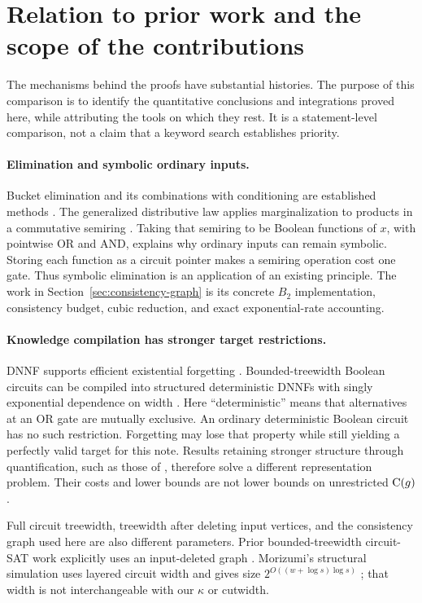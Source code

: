 \section{Relation to prior work and the scope of the contributions}
\label{sec:prior-work}

The mechanisms behind the proofs have substantial histories. The purpose
of this comparison is to identify the quantitative conclusions and
integrations proved here, while attributing the tools on which they rest.
It is a statement-level comparison, not a claim that a keyword search
establishes priority.

\paragraph{Elimination and symbolic ordinary inputs.}
Bucket elimination and its combinations with conditioning are established
methods \citep{Dechter1999}. The generalized distributive law applies
marginalization to products in a commutative semiring \citep{Aji2000}.
Taking that semiring to be Boolean functions of $x$, with pointwise OR
and AND, explains why ordinary inputs can remain symbolic. Storing each
function as a circuit pointer makes a semiring operation cost one gate.
Thus symbolic elimination is an application of an existing principle.
The work in Section~\ref{sec:consistency-graph} is its concrete
$B_2$ implementation, consistency budget, cubic reduction, and exact
exponential-rate accounting.

\paragraph{Knowledge compilation has stronger target restrictions.}
DNNF supports efficient existential forgetting
\citep{DarwicheMarquis2002}. Bounded-treewidth Boolean circuits can be
compiled into structured deterministic DNNFs with singly exponential
dependence on width \citep{Amarilli2020}. Here ``deterministic'' means
that alternatives at an OR gate are mutually exclusive. An ordinary
deterministic Boolean circuit has no such restriction. Forgetting may
lose that property while still yielding a perfectly valid target for
this note. Results retaining stronger structure through quantification,
such as those of \citet{CapelliMengel2019}, therefore solve a different
representation problem. Their costs and lower bounds are not lower
bounds on unrestricted $\mathrm{C}(g)$.

Full circuit treewidth, treewidth after deleting input vertices, and
the consistency graph used here are also different parameters. Prior
bounded-treewidth circuit-SAT work explicitly uses an input-deleted
graph \citep{Lokshtanov2018}. Morizumi's structural simulation uses
layered circuit width and gives size
$2^{O((w+\log s)\log s)}$ \citep[Theorem 4]{Morizumi2018}; that width
is not interchangeable with our $\kappa$ or cutwidth.

